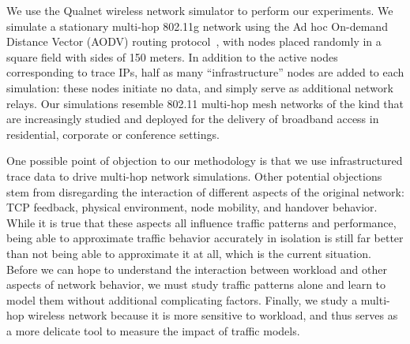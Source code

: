\documentclass[conference]{IEEEtran}
\newcommand{\caps}[1]{{\small{#1}}}
\begin{document}
We use the Qualnet wireless network simulator to perform our experiments. We simulate a stationary multi-hop 802.11g network using the Ad hoc On-demand Distance Vector (\caps{AODV}) routing protocol~\cite{rfc:aodv}, with nodes placed randomly in a square field with sides of 150 meters. In addition to the active nodes corresponding to trace \caps{IP}s, half as many ``infrastructure'' nodes are added to each simulation: these nodes initiate no data, and simply serve as additional network relays. Our simulations resemble 802.11 multi-hop mesh networks of the kind that are increasingly studied and deployed for the delivery of broadband access in residential, corporate or conference settings.

One possible point of objection to our methodology is that we use infrastructured trace data to drive multi-hop network simulations. Other potential objections stem from disregarding the interaction of different aspects of the original network: \caps{TCP} feedback, physical environment, node mobility, and handover behavior. While it is true that these aspects all influence traffic patterns and performance, being able to approximate traffic behavior accurately in isolation is still far better than not being able to approximate it at all, which is the current situation. Before we can hope to understand the interaction between workload and other aspects of network behavior, we must study traffic patterns alone and learn to model them without additional complicating factors. Finally, we study a multi-hop wireless network because it is more sensitive to workload, and thus serves as a more delicate tool to measure the impact of traffic models.


\end{document}
